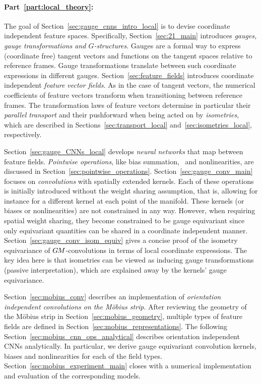 \paragraph{Part~\ref{part:local_theory}:}

The goal of Section~\ref{sec:gauge_cnns_intro_local} is to devise coordinate independent feature spaces.
Specifically, Section~\ref{sec:21_main} introduces \emph{gauges, gauge transformations and $G$-structures}.
Gauges are a formal way to express (coordinate free) tangent vectors and functions on the tangent spaces relative to reference frames.
Gauge transformations translate between such coordinate expressions in different gauges.
Section~\ref{sec:feature_fields} introduces coordinate independent \emph{feature vector fields}.
As in the case of tangent vectors, the numerical coefficients of feature vectors transform when transitioning between reference frames.
The transformation laws of feature vectors determine in particular their \emph{parallel transport} and their pushforward when being acted on by \emph{isometries}, which are described in Sections~\ref{sec:transport_local} and~\ref{sec:isometries_local}, respectively.

Section~\ref{sec:gauge_CNNs_local} develops \emph{neural networks} that map between feature fields.
\emph{Pointwise operations}, like bias summation, \onexones\ and nonlinearities, are discussed in Section~\ref{sec:pointwise_operations}.
Section~\ref{sec:gauge_conv_main} focuses on \emph{convolutions} with spatially extended kernels.
Each of these operations is initially introduced without the weight sharing assumption, that is, allowing for instance for a different kernel at each point of the manifold.
These kernels (or biases or nonlinearities) are not constrained in any way.
However, when requiring spatial weight sharing, they become constrained to be gauge equivariant since only equivariant quantities can be shared in a coordinate independent manner.
Section~\ref{sec:gauge_conv_isom_equiv} gives a concise proof of the isometry equivariance of $G\mkern-1.4muM$-convolutions in terms of local coordinate expressions.
The key idea here is that isometries can be viewed as inducing gauge transformations (passive interpretation), which are explained away by the kernels' gauge equivariance.

Section~\ref{sec:mobius_conv} describes an implementation of \emph{orientation independent convolutions on the M\"obius strip}.
After reviewing the geometry of the M\"obius strip in Section~\ref{sec:mobius_geometry}, multiple types of feature fields are defined in Section~\ref{sec:mobius_representations}.
The following Section~\ref{sec:mobius_cnn_ops_analytical} describes orientation independent CNNs analytically.
In particular, we derive gauge equivariant convolution kernels, biases and nonlinearities for each of the field types.
Section~\ref{sec:mobius_experiment_main} closes with a numerical implementation and evaluation of the corresponding models.




